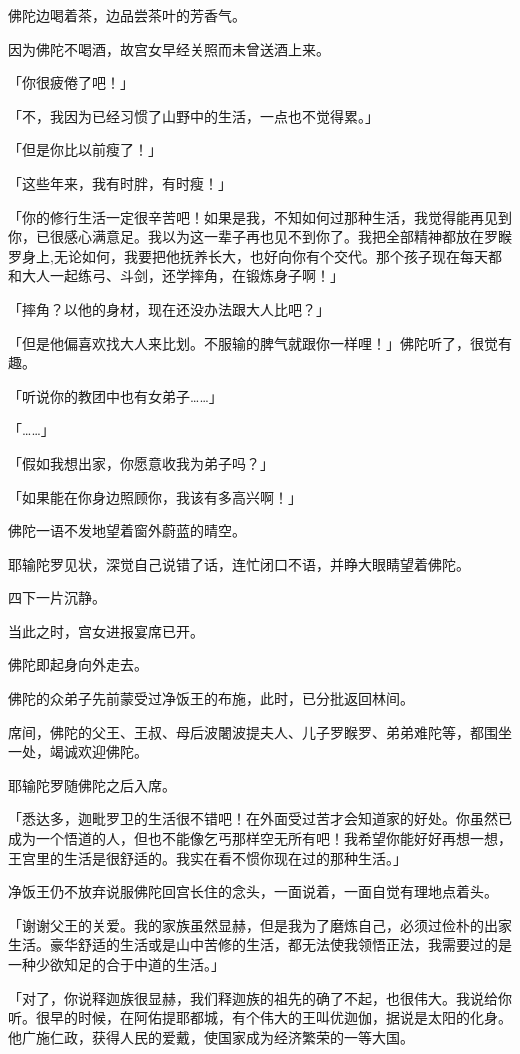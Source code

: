 \documentclass[twoside,openany]{book}
\begin{document}
佛陀边喝着茶，边品尝茶叶的芳香气。

因为佛陀不喝酒，故宫女早经关照而未曾送酒上来。

「你很疲倦了吧！」

「不，我因为已经习惯了山野中的生活，一点也不觉得累。」

「但是你比以前瘦了！」

「这些年来，我有时胖，有时瘦！」

「你的修行生活一定很辛苦吧！如果是我，不知如何过那种生活，我觉得能再见到你，已很感心满意足。我以为这一辈子再也见不到你了。我把全部精神都放在罗睺罗身上,无论如何，我要把他抚养长大，也好向你有个交代。那个孩子现在每天都和大人一起练弓、斗剑，还学摔角，在锻炼身子啊！」

「摔角？以他的身材，现在还没办法跟大人比吧？」

「但是他偏喜欢找大人来比划。不服输的脾气就跟你一样哩！」佛陀听了，很觉有趣。

「听说你的教团中也有女弟子……」

「……」

「假如我想出家，你愿意收我为弟子吗？」

「如果能在你身边照顾你，我该有多高兴啊！」

佛陀一语不发地望着窗外蔚蓝的晴空。

耶输陀罗见状，深觉自己说错了话，连忙闭口不语，并睁大眼睛望着佛陀。

四下一片沉静。

当此之时，宫女进报宴席已开。

佛陀即起身向外走去。

佛陀的众弟子先前蒙受过净饭王的布施，此时，已分批返回林间。

席间，佛陀的父王、王叔、母后波闍波提夫人、儿子罗睺罗、弟弟难陀等，都围坐一处，竭诚欢迎佛陀。

耶输陀罗随佛陀之后入席。

「悉达多，迦毗罗卫的生活很不错吧！在外面受过苦才会知道家的好处。你虽然已成为一个悟道的人，但也不能像乞丐那样空无所有吧！我希望你能好好再想一想，王宫里的生活是很舒适的。我实在看不惯你现在过的那种生活。」

净饭王仍不放弃说服佛陀回宫长住的念头，一面说着，一面自觉有理地点着头。

「谢谢父王的关爱。我的家族虽然显赫，但是我为了磨炼自己，必须过俭朴的出家生活。豪华舒适的生活或是山中苦修的生活，都无法使我领悟正法，我需要过的是一种少欲知足的合于中道的生活。」

「对了，你说释迦族很显赫，我们释迦族的祖先的确了不起，也很伟大。我说给你听。很早的时候，在阿佑提耶都城，有个伟大的王叫优迦伽，据说是太阳的化身。他广施仁政，获得人民的爱戴，使国家成为经济繁荣的一等大国。
\end{document}
